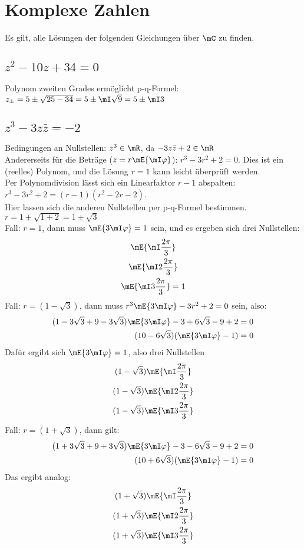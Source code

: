 \section{Komplexe Zahlen}
	Es gilt, alle Lösungen der folgenden Gleichungen über $\mC$ zu finden.
	\subsection{$z^2-10 z + 34= 0$}
	Polynom zweiten Grades ermöglicht p-q-Formel:$z_\pm = 5 \pm \sqrt{25-34} = 5 \pm \mI \sqrt{9} = 5 \pm \mI 3$

	\subsection{$z^3-3 z\bar{z} = - 2$}
	Bedingungen an Nullstellen: $z^3 \in \mR$, da $-3z\bar{z}+2\in \mR$\\
	Andererseits für die Beträge ($z=r\mE{\mI\varphi}$): $r^3-3r^2+2=0$. Dies ist ein (reelles) Polynom, und die Lösung $r=1$ kann leicht überprüft werden.\\
	Per Polynomdivision lässt sich ein Linearfaktor $r-1$ abspalten: $r^3-3r^2+2 = (r-1)(r^2-2r-2)$.\\
	Hier lassen sich die anderen Nullstellen per p-q-Formel bestimmen. $r = 1 \pm \sqrt{1+2} = 1\pm\sqrt{3}$\\
	Fall: $r = 1$, dann muss $\mE{3\mI\varphi} = 1$ sein, und es ergeben sich drei Nullstellen:
	\begin{gather}
		\mE{\mI\frac{2\pi}{3}} \\
		\mE{\mI 2\frac{2\pi}{3}}\\
		\mE{\mI 3\frac{2\pi}{3}}=1
	\end{gather}
	Fall: $r = (1 - \sqrt{3})$, dann muss $r^3\mE{3\mI\varphi} - 3 r^2 + 2 = 0$ sein, also:
	\begin{align}
		(1 - 3\sqrt{3} + 9 - 3\sqrt{3})\mE{3\mI\varphi} - 3 + 6 \sqrt{3} - 9 +2 & = 0 \\
		(10-6\sqrt{3})(\mE{3\mI\varphi}-1) & = 0
	\end{align}
	Dafür ergibt sich $\mE{3\mI\varphi} = 1$, also drei Nullstellen
	\begin{gather}
		(1 - \sqrt{3})\mE{\mI\frac{2\pi}{3}} \\
		(1 - \sqrt{3})\mE{\mI 2\frac{2\pi}{3}}\\
		(1 - \sqrt{3})\mE{\mI 3\frac{2\pi}{3}}
	\end{gather}
	Fall: $r = (1 + \sqrt{3})$, dann gilt:
	\begin{align}
		(1 + 3\sqrt{3} + 9 + 3\sqrt{3})\mE{3\mI\varphi} - 3 - 6 \sqrt{3} - 9 +2 & = 0 \\
		(10+6\sqrt{3})(\mE{3\mI\varphi}-1) & = 0
	\end{align}
	Das ergibt analog:
	\begin{gather}
		(1 + \sqrt{3})\mE{\mI\frac{2\pi}{3}} \\
		(1 + \sqrt{3})\mE{\mI 2\frac{2\pi}{3}}\\
		(1 + \sqrt{3})\mE{\mI 3\frac{2\pi}{3}}
	\end{gather}

